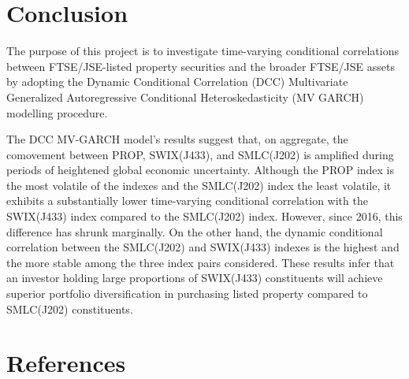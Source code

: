 \documentclass[11pt,preprint, authoryear]{elsarticle}
\numberwithin{equation}{section}
\numberwithin{figure}{section}
\numberwithin{table}{section}
\begin{document}
\hypertarget{conclusion}{%
\section{Conclusion}\label{conclusion}}

The purpose of this project is to investigate time-varying conditional
correlations between FTSE/JSE-listed property securities and the broader
FTSE/JSE assets by adopting the Dynamic Conditional Correlation (DCC)
Multivariate Generalized Autoregressive Conditional Heteroskedasticity
(MV GARCH) modelling procedure.

The DCC MV-GARCH model's results suggest that, on aggregate, the
comovement between PROP, SWIX(J433), and SMLC(J202) is amplified during
periods of heightened global economic uncertainty. Although the PROP
index is the most volatile of the indexes and the SMLC(J202) index the
least volatile, it exhibits a substantially lower time-varying
conditional correlation with the SWIX(J433) index compared to the
SMLC(J202) index. However, since 2016, this difference has shrunk
marginally. On the other hand, the dynamic conditional correlation
between the SMLC(J202) and SWIX(J433) indexes is the highest and the
more stable among the three index pairs considered. These results infer
that an investor holding large proportions of SWIX(J433) constituents
will achieve superior portfolio diversification in purchasing listed
property compared to SMLC(J202) constituents.

\newpage

\hypertarget{references}{%
\section*{References}\label{references}}
\end{document}
